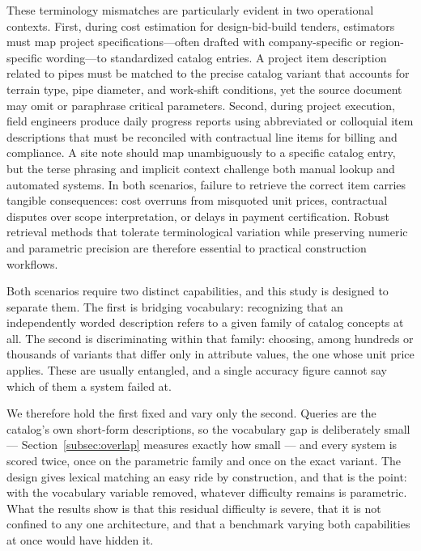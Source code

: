 \documentclass[preprint,review,12pt]{elsarticle}
\begin{document}
These terminology mismatches are particularly evident in two operational contexts. First, during cost estimation for design-bid-build tenders, estimators must map project specifications—often drafted with company-specific or region-specific wording—to standardized catalog entries. A project item description related to pipes must be matched to the precise catalog variant that accounts for terrain type, pipe diameter, and work-shift conditions, yet the source document may omit or paraphrase critical parameters. Second, during project execution, field engineers produce daily progress reports using abbreviated or colloquial item descriptions that must be reconciled with contractual line items for billing and compliance. A site note should map unambiguously to a specific catalog entry, but the terse phrasing and implicit context challenge both manual lookup and automated systems. In both scenarios, failure to retrieve the correct item carries tangible consequences: cost overruns from misquoted unit prices, contractual disputes over scope interpretation, or delays in payment certification. Robust retrieval methods that tolerate terminological variation while preserving numeric and parametric precision are therefore essential to practical construction workflows.

Both scenarios require two distinct capabilities, and this study is designed to separate them. The first is bridging vocabulary: recognizing that an independently worded description refers to a given family of catalog concepts at all. The second is discriminating within that family: choosing, among hundreds or thousands of variants that differ only in attribute values, the one whose unit price applies. These are usually entangled, and a single accuracy figure cannot say which of them a system failed at.

We therefore hold the first fixed and vary only the second. Queries are the catalog's own short-form descriptions, so the vocabulary gap is deliberately small --- Section~\ref{subsec:overlap} measures exactly how small --- and every system is scored twice, once on the parametric family and once on the exact variant. The design gives lexical matching an easy ride by construction, and that is the point: with the vocabulary variable removed, whatever difficulty remains is parametric. What the results show is that this residual difficulty is severe, that it is not confined to any one architecture, and that a benchmark varying both capabilities at once would have hidden it.
\end{document}
